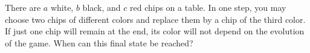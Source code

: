 There are $a$ white, $b$ black, and $c$ red chips on a table. In one step, you may choose two chips of different colors and replace them by a chip of the third color. If just one chip will remain at the end, its color will not depend on the evolution of the game. When can this final state be reached?
